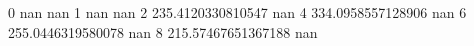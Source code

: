 0 nan nan
1 nan nan
2 235.4120330810547 nan
4 334.0958557128906 nan
6 255.0446319580078 nan
8 215.57467651367188 nan

